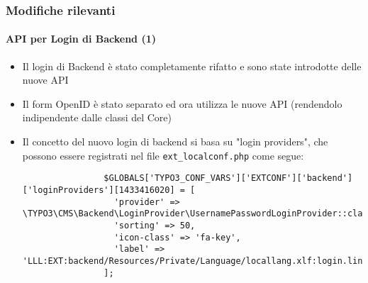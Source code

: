 \begin{frame}[fragile]
	\frametitle{Modifiche rilevanti}
	\framesubtitle{API per Login di Backend (1)}

	\lstset{basicstyle=\tiny\ttfamily}

	\begin{itemize}

		\item Il login di Backend è stato completamente rifatto e sono state introdotte delle nuove API

		\item Il form OpenID è stato separato ed ora utilizza le nuove API
			(rendendolo indipendente dalle classi del Core)

		\item Il concetto del nuovo login di backend si basa su "login providers", che possono essere
			registrati nel file \texttt{ext\_localconf.php} come segue:

			\begin{lstlisting}
				$GLOBALS['TYPO3_CONF_VARS']['EXTCONF']['backend']['loginProviders'][1433416020] = [
				  'provider' => \TYPO3\CMS\Backend\LoginProvider\UsernamePasswordLoginProvider::class,
				  'sorting' => 50,
				  'icon-class' => 'fa-key',
				  'label' => 'LLL:EXT:backend/Resources/Private/Language/locallang.xlf:login.link'
				];
			\end{lstlisting}

	\end{itemize}

\end{frame}


